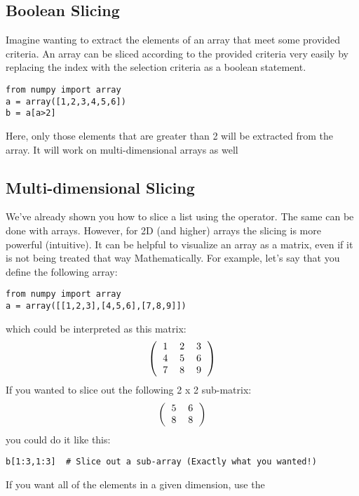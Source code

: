 \subsection*{Boolean Slicing}
Imagine wanting to extract the elements of an array that meet some
provided criteria.  An array can be sliced according to the provided
criteria very easily by replacing the index with the selection
criteria as a boolean statement.
\begin{Verbatim}
from numpy import array
a = array([1,2,3,4,5,6])
b = a[a>2]
\end{Verbatim}
Here, only those elements that are greater than 2 will be extracted
from the array.  It will work on multi-dimensional arrays as well

\subsection*{Multi-dimensional Slicing}
We've already shown you how to slice a list using the \code{:}
operator.  The same can be done with arrays.  However, for 2D (and
higher) arrays the slicing is more powerful (intuitive).  It can be
helpful to visualize an array as a matrix, even if it is not being
treated that way Mathematically.  For example, let's say that you
define the following array:
\begin{Verbatim}
from numpy import array
a = array([[1,2,3],[4,5,6],[7,8,9]])
\end{Verbatim}
which could be interpreted as this matrix:
\begin{equation}
\left( \begin{tabular}{ccc}
1 & 2 & 3\\
4 & 5 & 6\\
7 & 8 & 9\\
\end{tabular}
\right)
\end{equation}
If you wanted to slice out the following 2 x 2 sub-matrix:
\begin{equation}
\left(\begin{tabular}{cc}
5 & 6 \\
8 & 8 \\
\end{tabular}
\right)
\end{equation}
you could do it like this:
\begin{Verbatim}
b[1:3,1:3]  # Slice out a sub-array (Exactly what you wanted!)
\end{Verbatim}
If you want all of the elements in a given dimension, use the \code{:}
